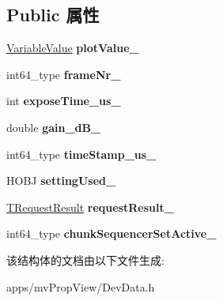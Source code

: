 \subsection*{Public 属性}
\begin{DoxyCompactItemize}
\item 
\hypertarget{struct_request_info_data_aa3b0137a822b338fc72ab796405aeab3}{\hyperlink{struct_variable_value}{Variable\+Value} {\bfseries plot\+Value\+\_\+}}\label{struct_request_info_data_aa3b0137a822b338fc72ab796405aeab3}

\item 
\hypertarget{struct_request_info_data_aefd0752a727bd4b8c9f0e6c28bd852a6}{int64\+\_\+type {\bfseries frame\+Nr\+\_\+}}\label{struct_request_info_data_aefd0752a727bd4b8c9f0e6c28bd852a6}

\item 
\hypertarget{struct_request_info_data_a90b0089985dd8b1f29708342051de4c5}{int {\bfseries expose\+Time\+\_\+us\+\_\+}}\label{struct_request_info_data_a90b0089985dd8b1f29708342051de4c5}

\item 
\hypertarget{struct_request_info_data_a53e77271390debf48646b238a748a28e}{double {\bfseries gain\+\_\+d\+B\+\_\+}}\label{struct_request_info_data_a53e77271390debf48646b238a748a28e}

\item 
\hypertarget{struct_request_info_data_a99d86bd8d5c56699245b00b81d2fe220}{int64\+\_\+type {\bfseries time\+Stamp\+\_\+us\+\_\+}}\label{struct_request_info_data_a99d86bd8d5c56699245b00b81d2fe220}

\item 
\hypertarget{struct_request_info_data_a6f9cea36166b608f1601cc4b152640c9}{H\+O\+B\+J {\bfseries setting\+Used\+\_\+}}\label{struct_request_info_data_a6f9cea36166b608f1601cc4b152640c9}

\item 
\hypertarget{struct_request_info_data_aa201922c5b7a891536c6743e207ce742}{\hyperlink{group___common_interface_gab6148762ea638f8eabbabfc9468b0d4c}{T\+Request\+Result} {\bfseries request\+Result\+\_\+}}\label{struct_request_info_data_aa201922c5b7a891536c6743e207ce742}

\item 
\hypertarget{struct_request_info_data_ab2ffa3a99e43da49ebba719df62ee46d}{int64\+\_\+type {\bfseries chunk\+Sequencer\+Set\+Active\+\_\+}}\label{struct_request_info_data_ab2ffa3a99e43da49ebba719df62ee46d}

\end{DoxyCompactItemize}


该结构体的文档由以下文件生成\+:\begin{DoxyCompactItemize}
\item 
apps/mv\+Prop\+View/Dev\+Data.\+h\end{DoxyCompactItemize}
